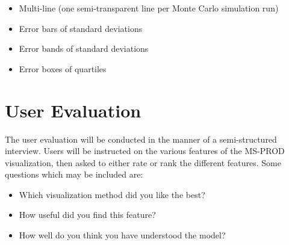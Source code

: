  \begin{itemize}
   \item Multi-line (one semi-transparent line per Monte Carlo simulation run)
   \item Error bars of standard deviations
   \item Error bands of standard deviations
   \item Error boxes of quartiles
 \end{itemize}

\section{User Evaluation}

The user evaluation will be conducted in the manner of a semi-structured interview.  Users will be instructed on the various features of the MS-PROD visualization, then asked to either rate or rank the different features.  Some questions which may be included are:

\begin{itemize}
  \item Which visualization method did you like the best?
  \item How useful did you find this feature?
  \item How well do you think you have understood the model?
\end{itemize}